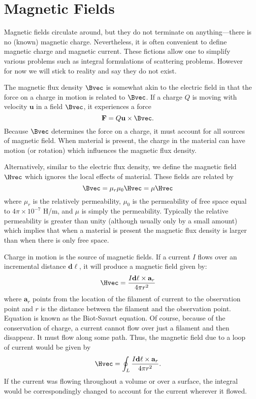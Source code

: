 \section{Magnetic Fields}

Magnetic fields circulate around, but they do not terminate on
anything---there is no (known) magnetic charge.  Nevertheless, it is
often convenient to define magnetic charge and magnetic current.
These fictions allow one to simplify various problems such as integral
formulations of scattering problems.  However for now we will stick to
reality and say they do not exist.

The magnetic flux density $\Bvec$ is somewhat akin to the electric
field in that the force on a charge in motion is related to $\Bvec$.
If a charge $Q$ is moving with velocity $\mathbf{u}$ in a field
$\Bvec$, it experiences a force
\begin{equation}
  \mathbf{F} = Q \mathbf{u}\times\Bvec.
\end{equation}
Because $\Bvec$ determines the force on a charge, it must account for
all sources of magnetic field.  When material is present, the charge
in the material can have motion (or rotation) which influences the
magnetic flux density.

Alternatively, similar to the electric flux density, we define the
magnetic field $\Hvec$ which ignores the local effects of material.
These fields are related by
\begin{equation}
  \Bvec = \mu_r\mu_0 \Hvec = \mu\Hvec
\end{equation}
where $\mu_r$ is the relatively permeability, $\mu_0$ is the
permeability of free space equal to $4\pi\times 10^{-7}$ H/m, and
$\mu$ is simply the permeability.  Typically the relative permeability
is greater than unity (although usually only by a small amount) which
implies that when a material is present the magnetic flux density is
larger than when there is only free space.

Charge in motion is the source of magnetic fields.  If a current $I$
flows over an incremental distance $\mathbf{d\ell}$, it will produce a
magnetic field given by:
\begin{equation}
  \Hvec = \frac{I\mathbf{d\ell}\times \mathbf{a}_r}
               {4 \pi r^2}
  \label{eq:biot}
\end{equation}
where $\mathbf{a}_r$ points from the location of the filament of
current to the observation point and $r$ is the distance between the
filament and the observation point.  Equation  is known
as the Biot-Savart equation.  Of course, because of the conservation
of charge, a current cannot flow over just a filament and then
disappear.  It must flow along some path.  Thus, the magnetic field
due to a loop of current would be given by
\begin{equation}
  \Hvec = \oint_L\frac{I\mathbf{d\ell}\times \mathbf{a}_r}
               {4 \pi r^2}.
  \label{eq:biotIntegral}
\end{equation}
If the current was flowing throughout a volume or over a surface, the
integral would be correspondingly changed to account for the
current wherever it flowed.

